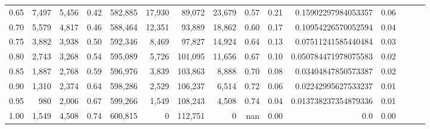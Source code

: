 \begin{tabular}{rrrrrrrrrrrrrrr}
0.65 &   7,497 &  5,456 &  0.42 &  582,885 &   17,930 &   89,072 &   23,679 &  0.57 &  0.21 &   0.15902297984053357 &      0.06 \\
0.70 &   5,579 &  4,817 &  0.46 &  588,464 &   12,351 &   93,889 &   18,862 &  0.60 &  0.17 &   0.10954226570052594 &      0.04 \\
0.75 &   3,882 &  3,938 &  0.50 &  592,346 &    8,469 &   97,827 &   14,924 &  0.64 &  0.13 &   0.07511241585440484 &      0.03 \\
0.80 &   2,743 &  3,268 &  0.54 &  595,089 &    5,726 &  101,095 &   11,656 &  0.67 &  0.10 &  0.050784471978075583 &      0.02 \\
0.85 &   1,887 &  2,768 &  0.59 &  596,976 &    3,839 &  103,863 &    8,888 &  0.70 &  0.08 &   0.03404847850573387 &      0.02 \\
0.90 &   1,310 &  2,374 &  0.64 &  598,286 &    2,529 &  106,237 &    6,514 &  0.72 &  0.06 &   0.02242995627533237 &      0.01 \\
0.95 &     980 &  2,006 &  0.67 &  599,266 &    1,549 &  108,243 &    4,508 &  0.74 &  0.04 &  0.013738237354879336 &      0.01 \\
1.00 &   1,549 &  4,508 &  0.74 &  600,815 &        0 &  112,751 &        0 &   nan &  0.00 &                   0.0 &      0.00 \\
\bottomrule
\end{tabular}
